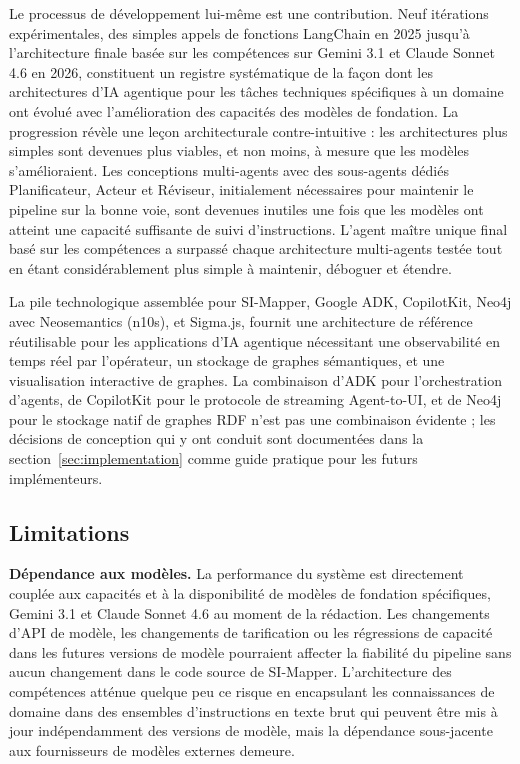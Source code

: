 Le processus de développement lui-même est une contribution.
Neuf itérations expérimentales, des simples appels de fonctions LangChain en 2025 jusqu'à l'architecture
finale basée sur les compétences sur Gemini 3.1 et Claude Sonnet 4.6 en 2026, constituent un registre
systématique de la façon dont les architectures d'IA agentique pour les tâches techniques spécifiques
à un domaine ont évolué avec l'amélioration des capacités des modèles de fondation.
La progression révèle une leçon architecturale contre-intuitive : les architectures plus simples sont
devenues plus viables, et non moins, à mesure que les modèles s'amélioraient.
Les conceptions multi-agents avec des sous-agents dédiés Planificateur, Acteur et Réviseur, initialement
nécessaires pour maintenir le pipeline sur la bonne voie, sont devenues inutiles une fois que les modèles
ont atteint une capacité suffisante de suivi d'instructions.
L'agent maître unique final basé sur les compétences a surpassé chaque architecture multi-agents testée
tout en étant considérablement plus simple à maintenir, déboguer et étendre.

La pile technologique assemblée pour SI-Mapper, Google ADK, CopilotKit, Neo4j avec Neosemantics
(n10s), et Sigma.js, fournit une architecture de référence réutilisable pour les applications d'IA
agentique nécessitant une observabilité en temps réel par l'opérateur, un stockage de graphes sémantiques,
et une visualisation interactive de graphes.
La combinaison d'ADK pour l'orchestration d'agents, de CopilotKit pour le protocole de streaming
Agent-to-UI, et de Neo4j pour le stockage natif de graphes RDF n'est pas une combinaison évidente ;
les décisions de conception qui y ont conduit sont documentées dans la section~\ref{sec:implementation}
comme guide pratique pour les futurs implémenteurs.

\subsection{Limitations}
\label{subsec:limitations}

\textbf{Dépendance aux modèles.}
La performance du système est directement couplée aux capacités et à la disponibilité de modèles de
fondation spécifiques, Gemini 3.1 et Claude Sonnet 4.6 au moment de la rédaction.
Les changements d'API de modèle, les changements de tarification ou les régressions de capacité dans
les futures versions de modèle pourraient affecter la fiabilité du pipeline sans aucun changement dans
le code source de SI-Mapper.
L'architecture des compétences atténue quelque peu ce risque en encapsulant les connaissances de domaine
dans des ensembles d'instructions en texte brut qui peuvent être mis à jour indépendamment des versions
de modèle, mais la dépendance sous-jacente aux fournisseurs de modèles externes demeure.

